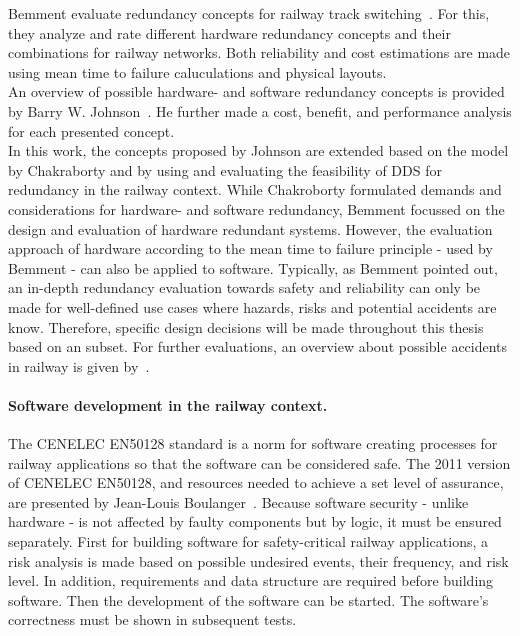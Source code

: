 Bemment \etal evaluate redundancy concepts for railway track switching~\cite{BemmentEvaluationOfRedundancy}.
For this, they analyze and rate different hardware redundancy concepts and their combinations for railway networks.
Both reliability and cost estimations are made using mean time to failure caluculations and physical layouts.
\\

An overview of possible hardware- and software redundancy concepts is provided by Barry W. Johnson~\cite{BarryFaultToleranceAnalysis}.
He further made a cost, benefit, and performance analysis for each presented concept.
\\

In this work, the concepts proposed by Johnson are extended based on the model by Chakraborty and by using and evaluating the feasibility of \gls*{DDS} for redundancy in the railway context.
While Chakroborty formulated demands and considerations for hardware- and software redundancy, Bemment \etal focussed on the design and evaluation of hardware redundant systems.
However, the evaluation approach of hardware according to the mean time to failure principle - used by Bemment \etal - can also be applied to software.
Typically, as Bemment \etal pointed out, an in-depth redundancy evaluation towards safety and reliability can only be made for well-defined use cases where hazards, risks and potential accidents are know.
Therefore, specific design decisions will be made throughout this thesis based on an  subset.
For further evaluations, an overview about possible accidents in railway is given by~\cite{ERTMSRailwayAccidents}.


\paragraph{Software development in the railway context.}
The CENELEC EN50128 standard is a norm for software creating processes for railway applications so that the software can be considered safe.
The 2011 version of CENELEC EN50128, and resources needed to achieve a set level of assurance, are presented by Jean-Louis Boulanger~\cite{BoulangerStandards}.
Because software security - unlike hardware - is not affected by faulty components but by logic, it must be ensured separately.
First for building software for safety-critical railway applications, a risk analysis is made based on possible undesired events, their frequency, and risk level.
In addition, requirements and data structure are required before building software.
Then the development of the software can be started.
The software's correctness must be shown in subsequent tests.
\\

